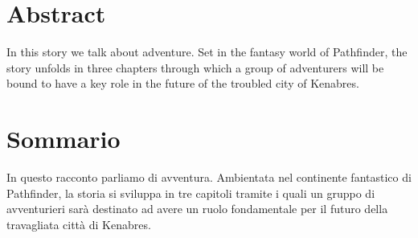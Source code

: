 
\begingroup
\let\clearpage\relax
\let\cleardoublepage\relax
\let\cleardoublepage\relax

\chapter*{Abstract}
In this story we talk about adventure. Set in the fantasy world of Pathfinder, the story unfolds in three chapters through which a group of adventurers will be bound to have a key role in the future of the troubled city of Kenabres.

\vfill

\chapter*{Sommario}
In questo racconto parliamo di avventura. Ambientata nel continente fantastico di Pathfinder, la storia si sviluppa in tre capitoli tramite i quali un gruppo di avventurieri sar\`a destinato ad avere un ruolo fondamentale per il futuro della travagliata citt\`a di Kenabres.

\endgroup			

\vfill

